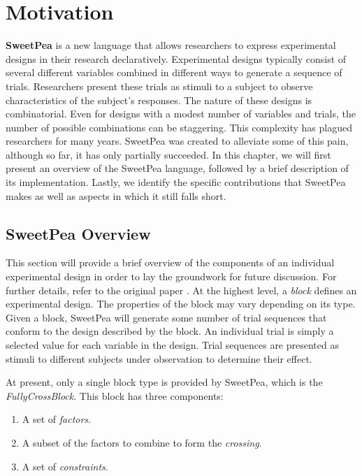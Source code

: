 \chapter{Motivation}

\textbf{SweetPea} \cite{annie} is a new language that allows researchers to express experimental designs in their research declaratively. Experimental designs typically consist of several different variables combined in different ways to generate a sequence of trials. Researchers present these trials as stimuli to a subject to observe characteristics of the subject's responses. The nature of these designs is combinatorial. Even for designs with a modest number of variables and trials, the number of possible combinations can be staggering. This complexity has plagued researchers for many years. SweetPea was created to alleviate some of this pain, although so far, it has only partially succeeded. In this chapter, we will first present an overview of the SweetPea language, followed by a brief description of its implementation. Lastly, we identify the specific contributions that SweetPea makes as well as aspects in which it still falls short.


\section{SweetPea Overview}

This section will provide a brief overview of the components of an individual experimental design in order to lay the groundwork for future discussion. For further details, refer to the original paper \cite{annie}. At the highest level, a \textit{block} defines an experimental design.  The properties of the block may vary depending on its type. Given a block, SweetPea will generate some number of trial sequences that conform to the design described by the block. An individual trial is simply a selected value for each variable in the design. Trial sequences are presented as stimuli to different subjects under observation to determine their effect.

At present, only a single block type is provided by SweetPea, which is the \textit{FullyCrossBlock}. This block has three components:

\begin{enumerate}
\item A set of \textit{factors}.
\item A subset of the factors to combine to form the \textit{crossing}.
\item A set of \textit{constraints}.
\end{enumerate}

